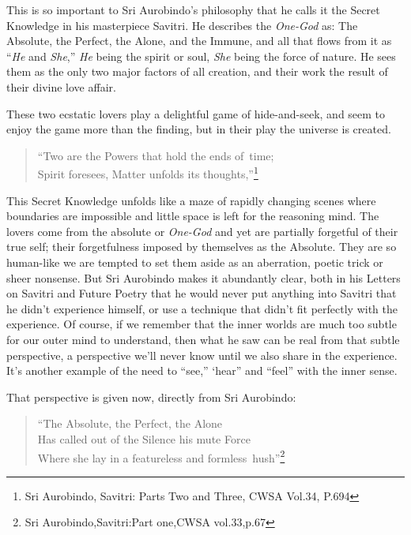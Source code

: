 \documentclass[12pt,a4paper]{book}
\begin{document}
This is so important to Sri Aurobindo's philosophy that he calls it
the Secret Knowledge in his masterpiece Savitri. He describes the
\emph{One-God} as: The Absolute, the Perfect, the Alone, and the
Immune, and all that flows from it as ``\emph{He} and \emph{She},''
\emph{He} being the spirit or soul, \emph{She} being the force of
nature. He sees them as the only two major factors of all creation,
and their work the result of their divine love affair.

These two ecstatic lovers play a delightful game of hide-and-seek, and
seem to enjoy the game more than the finding, but in their play the
universe is created.

\begin{verse}
``Two are the Powers that hold the ends of~time;\\ Spirit foresees,
  Matter unfolds its thoughts,''\footnote{Sri Aurobindo, Savitri:
    Parts Two and Three, CWSA Vol.34, P.694}
\end{verse}

This Secret Knowledge unfolds like a maze of rapidly changing scenes
where boundaries are impossible and little space is left for the
reasoning mind. The lovers come from the absolute or \emph{One-God}
and yet are partially forgetful of their true self; their
forgetfulness imposed by themselves as the Absolute. They are so
human-like we are tempted to set them aside as an aberration, poetic
trick or sheer nonsense. But Sri Aurobindo makes it abundantly clear,
both in his Letters on Savitri and Future Poetry that he would never
put anything into Savitri that he didn't experience himself, or use a
technique that didn't fit perfectly with the experience. Of course, if
we remember that the inner worlds are much too subtle for our outer
mind to understand, then what he saw can be real from that subtle
perspective, a perspective we'll never know until we also share in the
experience. It's another example of the need to ``see,'' ‘hear'' and
``feel'' with the inner sense.

\noindent That perspective is given now, directly from Sri Aurobindo:

\newpage
\begin{verse}
``The Absolute, the Perfect, the Alone\\
Has called out of the Silence his mute Force\\
Where she lay in a featureless and formless~hush''\footnote{Sri Aurobindo,Savitri:Part one,CWSA vol.33,p.67}
\end{verse}
\end{document}
